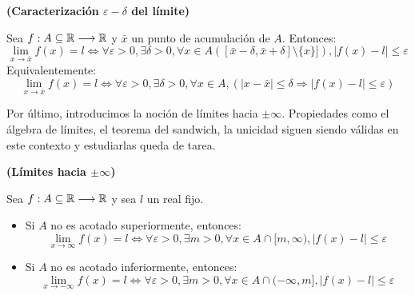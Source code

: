 \begin{proposicion}
	\textbf{(Caracterización $\varepsilon-\delta$ del límite)}
	
	Sea $f: A \subseteq \mathbb{R}\longrightarrow \mathbb{R}$ y $\bar{x}$ un punto de acumulación de $A$. Entonces: 
	$$ \lim_{x\rightarrow\bar{x}} f(x) = l \iff \forall \varepsilon > 0, \exists\delta > 0 , \forall x\in A ([\bar{x}- \delta , \bar{x}+\delta ]\setminus\{x\}]), | f(x) - l | \leq \varepsilon $$ 
	Equivalentemente: 
	$$ \lim_{x\rightarrow\bar{x}} f(x) = l \iff \forall \varepsilon > 0, \exists\delta > 0 , \forall x \in A , (| x - \bar{x}| \leq \delta \Longrightarrow | f(x) - l | \leq \varepsilon )$$ 
\end{proposicion}

Por último, introducimos la noción de límites hacia $\pm \infty$. Propiedades como el álgebra de límites, el teorema del sandwich, la unicidad siguen siendo válidas en este contexto y estudiarlas queda de tarea. 

\begin{definicion}
	\textbf{(Límites hacia $\pm \infty$)}
	
	Sea $f: A \subseteq \mathbb{R}\longrightarrow \mathbb{R}$ y sea $l$ un real fijo. 
	\begin{itemize}
		\item Si $A$ no es acotado superiormente, entonces: 
		$$\lim_{x\rightarrow\infty} f(x) = l \iff \forall \varepsilon > 0, \exists m > 0, \forall x\in A\cap [m, \infty) , | f(x) - l | \leq \varepsilon $$ 
		\item Si $A$ no es acotado inferiormente, entonces: 
		$$\lim_{x\rightarrow-\infty} f(x) = l \iff \forall \varepsilon > 0, \exists m > 0, \forall x\in A\cap (-\infty, m] , | f(x) - l | \leq \varepsilon $$ 
	\end{itemize}
\end{definicion}
	
